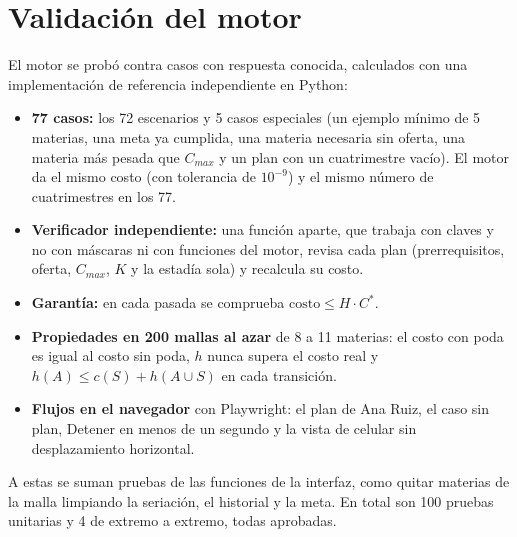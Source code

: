 \section{Validación del motor}
\label{SEC::Validacion}
El motor se probó contra casos con respuesta conocida, calculados con una implementación de referencia independiente en Python:
\begin{itemize}
    \item \textbf{77 casos:} los 72 escenarios y 5 casos especiales (un ejemplo mínimo de 5 materias, una meta ya cumplida, una materia necesaria sin oferta, una materia más pesada que $C_{max}$ y un plan con un cuatrimestre vacío). El motor da el mismo costo (con tolerancia de $10^{-9}$) y el mismo número de cuatrimestres en los 77.
    \item \textbf{Verificador independiente:} una función aparte, que trabaja con claves y no con máscaras ni con funciones del motor, revisa cada plan (prerrequisitos, oferta, $C_{max}$, $K$ y la estadía sola) y recalcula su costo.
    \item \textbf{Garantía:} en cada pasada se comprueba $\text{costo} \leq H \cdot C^*$.
    \item \textbf{Propiedades en 200 mallas al azar} de 8 a 11 materias: el costo con poda es igual al costo sin poda, $h$ nunca supera el costo real y $h(A) \leq c(S) + h(A \cup S)$ en cada transición.
    \item \textbf{Flujos en el navegador} con Playwright: el plan de Ana Ruiz, el caso sin plan, Detener en menos de un segundo y la vista de celular sin desplazamiento horizontal.
\end{itemize}
A estas se suman pruebas de las funciones de la interfaz, como quitar materias de la malla limpiando la seriación, el historial y la meta. En total son 100 pruebas unitarias y 4 de extremo a extremo, todas aprobadas.
